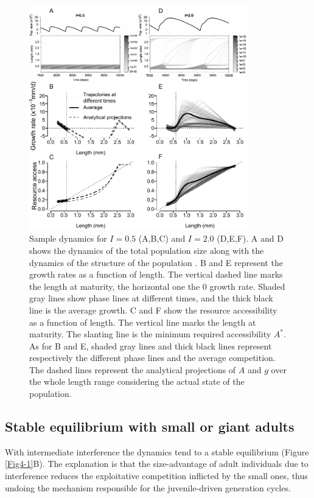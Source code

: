 \begin{figure}[!h] %
\centering
\includegraphics[width=0.85\textwidth]{4_ChapThe1/Fig/Fig2.pdf} 
\caption[Sample dynamics for $I=0.5$ and
$I=2.0$]{Sample dynamics for $I=0.5$ (A,B,C) and $I=2.0$ (D,E,F). A and D shows the dynamics of
the total population size along with the dynamics of the structure of the
population \autocite{mallard2012a}. B and E represent the growth rates as a
function of length. The vertical dashed line marks the length at maturity, the
horizontal one the $0$ growth rate. Shaded gray lines show phase lines at
different times, and the thick black line is the average growth. C and F show
the resource accessibility as a function of length. The vertical line marks the
length at maturity. The slanting line is the minimum required accessibility
$A^*$. As for B and E, shaded gray lines and thick black lines represent
respectively the different phase lines and the average competition. The dashed
lines represent the analytical projections of $A$ and $g$ over the whole length
range considering the actual state of the population.}
\label{Fig4-2}
\end{figure}

\subsection{Stable equilibrium with small or giant adults}

With intermediate interference the dynamics tend to a stable equilibrium (Figure
\ref{Fig4-1}B). The explanation is that the size-advantage of adult individuals
due to interference reduces the exploitative competition inflicted by the small
ones, thus undoing the mechanism responsible for the juvenile-driven generation
cycles.

